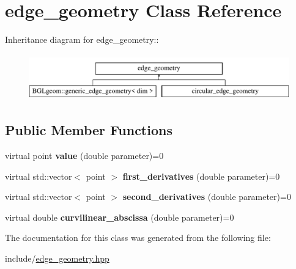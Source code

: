\hypertarget{classedge__geometry}{
\section{edge\_\-geometry Class Reference}
\label{classedge__geometry}
}
Inheritance diagram for edge\_\-geometry::\begin{figure}[H]
\begin{center}
\leavevmode
\includegraphics[height=2cm]{classedge__geometry}
\end{center}
\end{figure}
\subsection*{Public Member Functions}
\begin{DoxyCompactItemize}
\item 
\hypertarget{classedge__geometry_a2fb09747a5c3eeacb20ba7277091805b}{
virtual point {\bfseries value} (double parameter)=0}
\label{classedge__geometry_a2fb09747a5c3eeacb20ba7277091805b}

\item 
\hypertarget{classedge__geometry_a05ce36916af8c14730bbc4c723bf5586}{
virtual std::vector$<$ point $>$ {\bfseries first\_\-derivatives} (double parameter)=0}
\label{classedge__geometry_a05ce36916af8c14730bbc4c723bf5586}

\item 
\hypertarget{classedge__geometry_adda87250efddbfabcb23337274d5e728}{
virtual std::vector$<$ point $>$ {\bfseries second\_\-derivatives} (double parameter)=0}
\label{classedge__geometry_adda87250efddbfabcb23337274d5e728}

\item 
\hypertarget{classedge__geometry_a915ecdc8f2c6dd9434b50beaffe1d581}{
virtual double {\bfseries curvilinear\_\-abscissa} (double parameter)=0}
\label{classedge__geometry_a915ecdc8f2c6dd9434b50beaffe1d581}

\end{DoxyCompactItemize}


The documentation for this class was generated from the following file:\begin{DoxyCompactItemize}
\item 
include/\hyperlink{edge__geometry_8hpp}{edge\_\-geometry.hpp}\end{DoxyCompactItemize}
